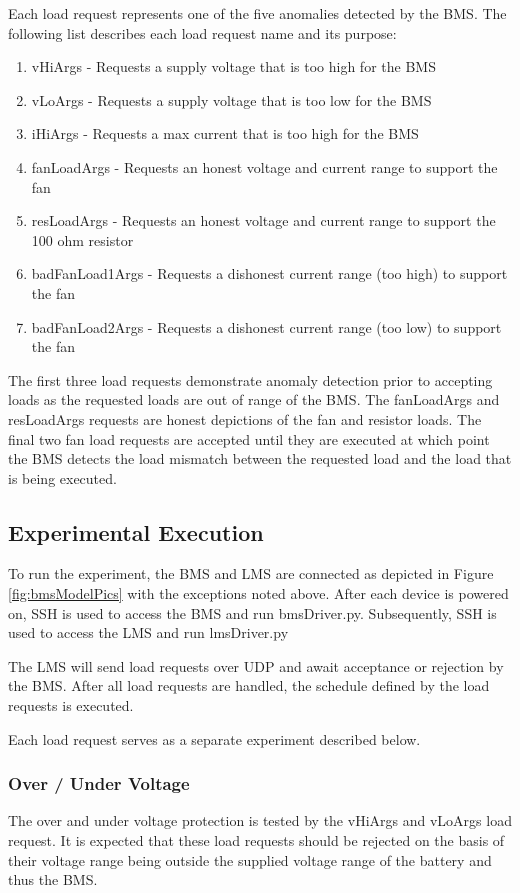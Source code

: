 \documentclass[11pt,conference,draftcls,onecolumn]{IEEEtran}
\begin{document}
Each load request represents one of the five anomalies detected by the BMS.
The following list describes each load request name and its purpose:
\begin{enumerate}
    \item vHiArgs - Requests a supply voltage that is too high for the BMS
    \item vLoArgs - Requests a supply voltage that is too low for the BMS
    \item iHiArgs - Requests a max current that is too high for the BMS
    \item fanLoadArgs - Requests an honest voltage and current range to support the fan
    \item resLoadArgs - Requests an honest voltage and current range to support the 100 ohm resistor
    \item badFanLoad1Args - Requests a dishonest current range (too high) to support the fan
    \item badFanLoad2Args - Requests a dishonest current range (too low) to support the fan
\end{enumerate}

The first three load requests demonstrate anomaly detection prior to accepting loads as the requested loads are out of range of the BMS.
The fanLoadArgs and resLoadArgs requests are honest depictions of the fan and resistor loads.
The final two fan load requests are accepted until they are executed at which point the BMS detects the load mismatch between the requested load and the load that is being executed.

\subsection{Experimental Execution}
To run the experiment, the BMS and LMS are connected as depicted in Figure \ref{fig:bmsModelPics} with the exceptions noted above.
After each device is powered on, SSH is used to access the BMS and run bmsDriver.py.
Subsequently, SSH is used to access the LMS and run lmsDriver.py

The LMS will send load requests over UDP and await acceptance or rejection by the BMS.
After all load requests are handled, the schedule defined by the load requests is executed.

Each load request serves as a separate experiment described below.

\subsubsection{Over / Under Voltage}
The over and under voltage protection is tested by the vHiArgs and vLoArgs load request.
It is expected that these load requests should be rejected on the basis of their voltage range being outside the supplied voltage range of the battery and thus the BMS. 
\end{document}
